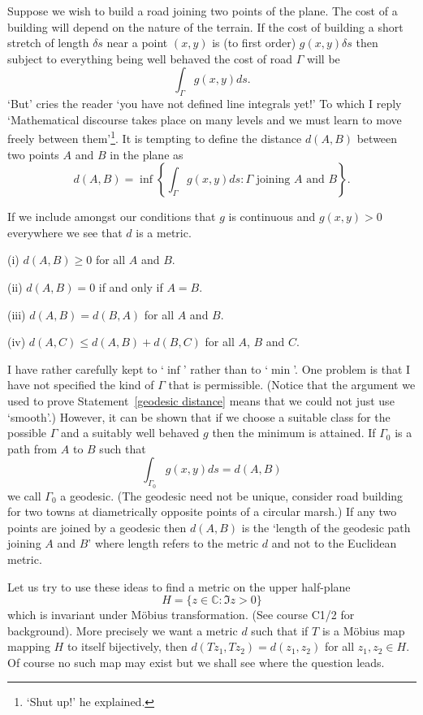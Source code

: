 Suppose we wish to build a road joining two points of the
plane. The cost of a building will depend on the
nature of the terrain. If the cost of building 
a short stretch of length $\delta s$ near a point $(x,y)$
is (to first order) $g(x,y)\delta s$ then
subject to everything being well behaved the cost
of  road  $\Gamma$ will be 
\[\int_{\Gamma}g(x,y)ds.\]
`But' cries the reader `you have not defined line
integrals yet!' To which I reply `Mathematical discourse
takes place on many levels and we must learn to move
freely between them'\footnote{`Shut up!' he explained.}.
It is tempting to define the distance $d(A,B)$ between
two points $A$ and $B$ in the plane as
\[d(A,B)=\inf\left\{\int_{\Gamma}g(x,y)ds:
\text{$\Gamma$ joining $A$ and $B$}\right\}.\]

If we include amongst our conditions that
$g$ is continuous and $g(x,y)>0$ everywhere
we see that $d$ is a metric.
\begin{statement}\label{geodesic distance}
(i) $d(A,B)\geq 0$ for all $A$ and $B$.

(ii) $d(A,B)=0$ if and only if $A=B$.

(iii) $d(A,B)=d(B,A)$ for all $A$ and $B$.

(iv) $d(A,C)\leq d(A,B)+d(B,C)$ for all $A$, $B$ and $C$.
\end{statement}

I have rather carefully kept to `$\inf$' rather than to `$\min$'.
One problem is that I have not specified the kind of
$\Gamma$ that is permissible. (Notice that the argument
we used to prove Statement~\ref{geodesic distance}
means that we could not just use `smooth'.)
However, it can be shown that if we choose a suitable
class for the possible $\Gamma$ and a suitably
well behaved $g$ then the minimum is attained.
If $\Gamma_{0}$ is a path from $A$ to $B$
such that
\[\int_{\Gamma_{0}}g(x,y)ds=d(A,B)\]
we call $\Gamma_{0}$ a geodesic. (The geodesic need
not be unique, consider road building for
two towns at diametrically
opposite points of a circular marsh.)
If any two points are joined by a geodesic then
$d(A,B)$ is the `length of the geodesic path joining
$A$ and $B$' where length refers to the metric $d$
and not to the Euclidean metric.

Let us try to use these ideas to find a metric
on the upper half-plane 
\[H=\{z\in{\mathbb C}:\Im z>0\}\]
which is invariant under M\"{o}bius transformation.
(See course C1/2 for background). More precisely
we want a metric $d$ such that if $T$ is a 
M\"{o}bius map mapping $H$ to itself bijectively,
then $d(Tz_{1},Tz_{2})=d(z_{1},z_{2})$ for all
$z_{1},z_{2}\in H$. Of course no such map may
exist but we shall see where the question leads.

